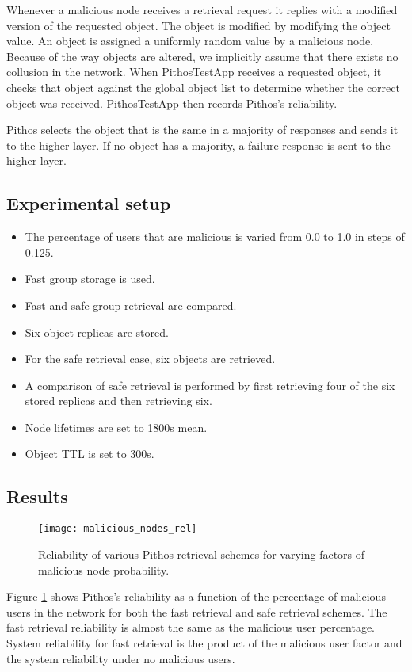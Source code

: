 Whenever a malicious node receives a retrieval request it replies with a modified version of the requested object. The object is modified by modifying the object value. An object is assigned a uniformly random value by a malicious node. Because of the way objects are altered, we implicitly assume that there exists no collusion in the network. When PithosTestApp receives a requested object, it checks that object against the global object list to determine whether the correct object was received. PithosTestApp then records Pithos's reliability.

Pithos selects the object that is the same in a majority of responses and sends it to the higher layer. If no object has a majority, a failure response is sent to the higher layer.

\subsection{Experimental setup}

\begin{itemize}
\item The percentage of users that are malicious is varied from 0.0 to 1.0 in steps of 0.125.

\item Fast group storage is used.

\item Fast and safe group retrieval are compared.

\item Six object replicas are stored.

\item For the safe retrieval case, six objects are retrieved.

\item A comparison of safe retrieval is performed by first retrieving four of the six stored replicas and then retrieving six.

\item Node lifetimes are set to 1800s mean.

\item Object TTL is set to 300s.
\end{itemize}

\subsection{Results}
\begin{figure}[htbp]
 \centering
 \texttt{[image: malicious\_nodes\_rel]}
 \caption{Reliability of various Pithos retrieval schemes for varying factors of malicious node probability.}
 \label{fig_malicious_nodes_rel}
\end{figure}
%
Figure \ref{fig_malicious_nodes_rel} shows Pithos's reliability as a function of the percentage of malicious users in the network for both the fast retrieval and safe retrieval schemes. The fast retrieval reliability is almost the same as the malicious user percentage. System reliability for fast retrieval is the product of the malicious user factor and the system reliability under no malicious users.

